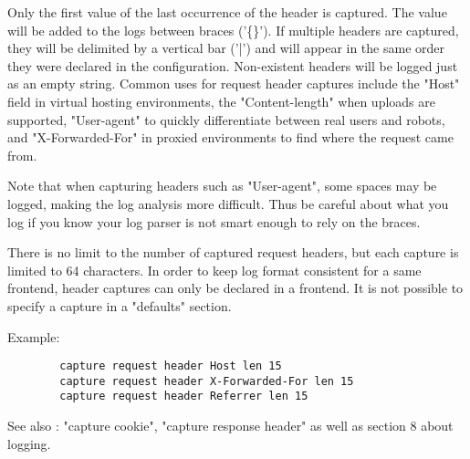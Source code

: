   Only the first value of the last occurrence of the header is captured. The
  value will be added to the logs between braces ('\{\}'). If multiple headers
  are captured, they will be delimited by a vertical bar ('|') and will appear
  in the same order they were declared in the configuration. Non-existent
  headers will be logged just as an empty string. Common uses for request
  header captures include the "Host" field in virtual hosting environments, the
  "Content-length" when uploads are supported, "User-agent" to quickly
  differentiate between real users and robots, and "X-Forwarded-For" in proxied
  environments to find where the request came from.

  Note that when capturing headers such as "User-agent", some spaces may be
  logged, making the log analysis more difficult. Thus be careful about what
  you log if you know your log parser is not smart enough to rely on the
  braces.

  There is no limit to the number of captured request headers, but each capture
  is limited to 64 characters. In order to keep log format consistent for a
  same frontend, header captures can only be declared in a frontend. It is not
  possible to specify a capture in a "defaults" section.

  Example:
  \begin{verbatim}
        capture request header Host len 15
        capture request header X-Forwarded-For len 15
        capture request header Referrer len 15
  \end{verbatim}

  See also : "capture cookie", "capture response header" as well as section 8
             about logging.
\endinput

capture response header <name> len <length>
  Capture and log the first occurrence of the specified response header.
  May be used in sections :   defaults | frontend | listen | backend
                                  no   |    yes   |   yes  |   no
  Arguments :
    <name>    is the name of the header to capture. The header names are not
              case-sensitive, but it is a common practice to write them as they
              appear in the response, with the first letter of each word in
              upper case. The header name will not appear in the logs, only the
              value is reported, but the position in the logs is respected.

    <length>  is the maximum number of characters to extract from the value and
              report in the logs. The string will be truncated on the right if
              it exceeds <length>.

